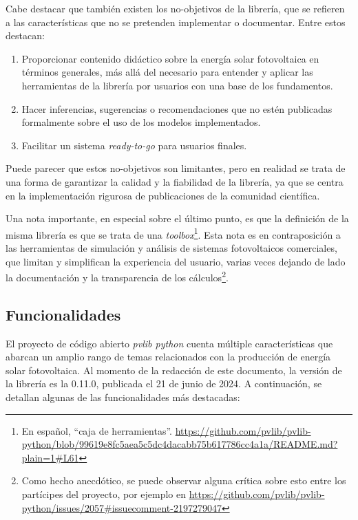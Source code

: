 Cabe destacar que también existen los no-objetivos de la librería, que se refieren a las características que no se pretenden implementar o documentar. Entre estos destacan:

\begin{enumerate}
      \item Proporcionar contenido didáctico sobre la energía solar fotovoltaica en términos generales, más allá del necesario para entender y aplicar las herramientas de la librería por usuarios con una base de los fundamentos.
      \item Hacer inferencias, sugerencias o recomendaciones que no estén publicadas formalmente sobre el uso de los modelos implementados.
      \item Facilitar un sistema \textit{ready-to-go} para usuarios finales.
\end{enumerate}

Puede parecer que estos no-objetivos son limitantes, pero en realidad se trata de una forma de garantizar la calidad y la fiabilidad de la librería, ya que se centra en la implementación rigurosa de publicaciones de la comunidad científica.

Una nota importante, en especial sobre el último punto, es que la definición de la misma librería es que se trata de una \textit{toolbox}\footnote{En español, ``caja de herramientas''. \url{https://github.com/pvlib/pvlib-python/blob/99619e8fc5aea5c5dc4dacabb75b617786cc4a1a/README.md?plain=1\#L61}}. Esta nota es en contraposición a las herramientas de simulación y análisis de sistemas fotovoltaicos comerciales, que limitan y simplifican la experiencia del usuario, varias veces dejando de lado la documentación y la transparencia de los cálculos\footnote{Como hecho anecdótico, se puede observar alguna crítica sobre esto entre los partícipes del proyecto, por ejemplo en \url{https://github.com/pvlib/pvlib-python/issues/2057\#issuecomment-2197279047}}.

\subsection{Funcionalidades} \label{ssct:pvlib:funcionalidades}

El proyecto de código abierto \textit{pvlib python} cuenta múltiple características que abarcan un amplio rango de temas relacionados con la producción de energía solar fotovoltaica. Al momento de la redacción de este documento, la versión de la librería es la 0.11.0, publicada el 21 de junio de 2024. A continuación, se detallan algunas de las funcionalidades más destacadas:

